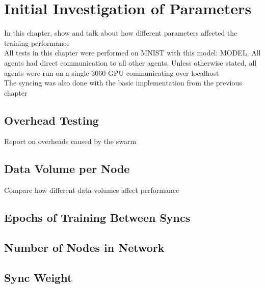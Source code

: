\chapter{Initial Investigation of Parameters}
In this chapter, show and talk about how different parameters affected the training performance \\
All tests in this chapter were performed on MNIST with this model: MODEL. All agents had direct communication to all other agents. Unless otherwise stated, all agents were run on a single 3060 GPU communicating over localhost\\
The syncing was also done with the basic implementation from the previous chapter
\section{Overhead Testing}
Report on overheads caused by the swarm
\section{Data Volume per Node}
Compare how different data volumes affect performance
\section{Epochs of Training Between Syncs}
\section{Number of Nodes in Network}
\section{Sync Weight}